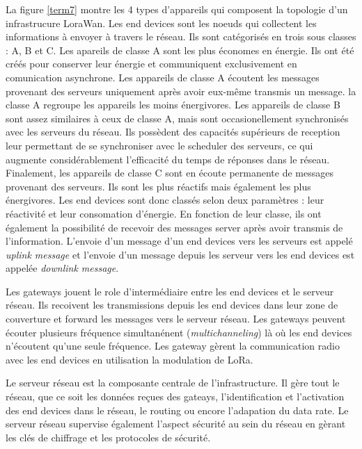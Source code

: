La figure \ref{term7} montre les 4 types d'appareils qui composent la topologie d'un infrastrucure LoraWan.
Les end devices sont les noeuds qui collectent les informations à envoyer à travers le réseau. Ils sont catégorisés en trois sous classes : A, B et C. Les apareils de classe A sont les plus économes en énergie. Ils ont été créés pour conserver leur énergie et communiquent exclusivement en comunication asynchrone. Les appareils de classe A écoutent les messages provenant des serveurs uniquement après avoir eux-même transmis un message. la classe A regroupe les appareils les moins énergivores. Les appareils de classe B sont assez similaires à ceux de classe A, mais sont occasionellement synchronisés avec les serveurs du réseau. Ils possèdent des capacités supérieurs de reception leur permettant de se synchroniser avec le scheduler des serveurs, ce qui augmente considérablement l'efficacité du temps de réponses dans le réseau. Finalement, les appareils de classe C sont en écoute permanente de messages provenant des serveurs. Ils sont les plus réactifs mais également les plus énergivores. Les end devices sont donc classés selon deux paramètres : leur réactivité et leur consomation d'énergie. En fonction de leur classe, ils ont également la possibilité de recevoir des messages server après avoir transmis de l'information. L'envoie d'un message d'un end devices vers les serveurs est appelé \textit{uplink message} et l'envoie d'un message depuis les serveur vers les end devices est appelée \textit{downlink message}.

\vspace{0.1cm}

Les gateways jouent le role d'intermédiaire entre les end devices et le serveur réseau. Ils recoivent les transmissions depuis les end devices dans leur zone de couverture
et forward les messages vers le serveur réseau. Les gateways peuvent écouter plusieurs fréquence simultanénent (\textit{multichanneling}) là où les end devices n'écoutent qu'une seule fréquence. Les gateway gèrent la communication radio avec les end devices en utilisation la modulation de LoRa.

\vspace{0.1cm}

Le serveur réseau est la composante centrale de l'infrastructure. Il gère tout le réseau, que ce soit les données reçues des gateays, l'identification et l'activation des end devices dans le réseau, le routing ou encore l'adapation du data rate. Le serveur réseau supervise également l'aspect sécurité au sein du réseau en gèrant les clés de chiffrage et les protocoles de sécurité.

